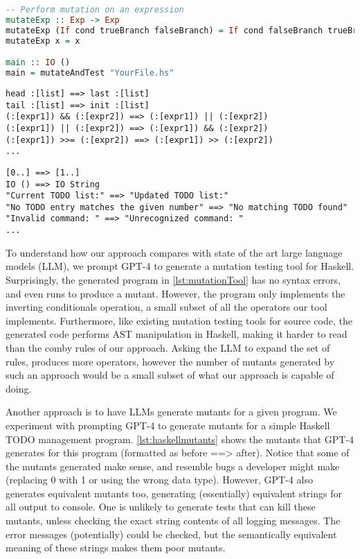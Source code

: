 \documentclass[acmsmall,screen,review,anonymous]{acmart}
\begin{document}
{\begin{lstlisting}[language=haskell,caption={\textbf{Haskell Mutation Tool}},label=lst:mutationTool]
-- Perform mutation on an expression
mutateExp :: Exp -> Exp
mutateExp (If cond trueBranch falseBranch) = If cond falseBranch trueBranch
mutateExp x = x

main :: IO ()
main = mutateAndTest "YourFile.hs"
\end{lstlisting}

\begin{lstlisting}[caption={\textbf{GPT-4 Comby Haskell Rules}},label=lst:haskellcomby]
head :[list] ==> last :[list]
tail :[list] ==> init :[list]
(:[expr1]) && (:[expr2]) ==> (:[expr1]) || (:[expr2])
(:[expr1]) || (:[expr2]) ==> (:[expr1]) && (:[expr2])
(:[expr1]) >>= (:[expr2]) ==> (:[expr1]) >> (:[expr2])
...
\end{lstlisting}

\begin{lstlisting}[caption={\textbf{GPT-4 Mutants on a simple Haskell Program}},label=lst:haskellmutants]
[0..] ==> [1..]
IO () ==> IO String  
"Current TODO list:" ==> "Updated TODO list:"
"No TODO entry matches the given number" ==> "No matching TODO found"
"Invalid command: " ==> "Unrecognized command: "
...
\end{lstlisting}

To understand how our approach compares with state of the art large language models (LLM), we prompt GPT-4 to generate a mutation testing tool for Haskell.
Surprisingly, the generated program in \cref{lst:mutationTool} has no syntax errors, and even runs to produce a mutant. However, the program only implements 
the inverting conditionals operation, a small subset of all the operators our tool implements. Furthermore, like existing mutation testing tools for source code,
the generated code performs AST manipulation in Haskell, making it harder to read than the comby rules of our approach. Asking the LLM to expand the set of rules,
 produces more operators, however the number of mutants generated by such an approach would be a small subset of what our approach is capable of doing. 

 Another approach is to have LLMs generate mutants for a given program. We experiment with prompting GPT-4 to generate mutants for a simple Haskell TODO management program.
 \cref{lst:haskellmutants} shows the mutants that GPT-4 generates for this program (formatted as before ==> after). Notice that some of the mutants generated make sense, and 
 resemble bugs a developer might make (replacing 0 with 1 or using the wrong data type). However, GPT-4 also generates equivalent mutants too, generating 
 (essentially) equivalent strings for all output to console. One is unlikely to generate tests that can kill these mutants, unless checking the exact string contents of all 
 logging messages. The error messages (potentially) could be checked, but the semantically equivalent meaning of these strings makes them poor mutants.

}
\end{document}
